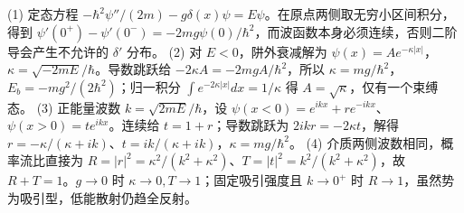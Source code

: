 (1) 定态方程 \(-\hbar^2\psi''/(2m)-g\delta(x)\psi=E\psi\)。在原点两侧取无穷小区间积分，得到 \(\psi'(0^+)-\psi'(0^-)=-2mg\psi(0)/\hbar^2\)，而波函数本身必须连续，否则二阶导会产生不允许的 \(\delta'\) 分布。
(2) 对 \(E<0\)，阱外衰减解为 \(\psi(x)=A e^{-\kappa|x|}\)，\(\kappa=\sqrt{-2mE}/\hbar\)。导数跳跃给 \(-2\kappa A=-2mgA/\hbar^2\)，所以 \(\kappa=mg/\hbar^2\)，\(E_b=-mg^2/(2\hbar^2)\)；归一积分 \(\int e^{-2\kappa|x|}dx=1/\kappa\) 得 \(A=\sqrt\kappa\)，仅有一个束缚态。
(3) 正能量波数 \(k=\sqrt{2mE}/\hbar\)，设 \(\psi(x<0)=e^{ikx}+r e^{-ikx}\)、\(\psi(x>0)=t e^{ikx}\)。连续给 \(t=1+r\)；导数跳跃为 \(2ik r=-2\kappa t\)，解得 \(r=-\kappa/(\kappa+ik)\)、\(t=ik/(\kappa+ik)\)，\(\kappa=mg/\hbar^2\)。
(4) 介质两侧波数相同，概率流比直接为 \(R=|r|^2=\kappa^2/(k^2+\kappa^2)\)、\(T=|t|^2=k^2/(k^2+\kappa^2)\)，故 \(R+T=1\)。\(g\to0\) 时 \(\kappa\to0,T\to1\)；固定吸引强度且 \(k\to0^+\) 时 \(R\to1\)，虽然势为吸引型，低能散射仍趋全反射。
